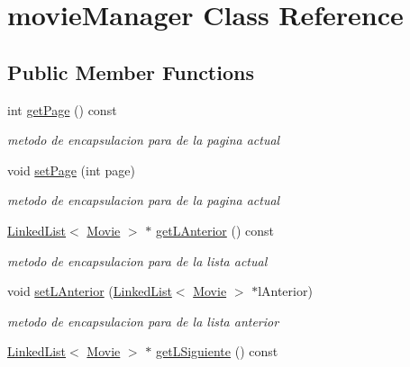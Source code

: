 \hypertarget{classmovieManager}{}\section{movie\+Manager Class Reference}
\label{classmovieManager}
\subsection*{Public Member Functions}
\begin{DoxyCompactItemize}
\item 
\mbox{\label{classmovieManager_adc89da5248a92df9f9d8ae06000752c4}} 
int \hyperlink{classmovieManager_adc89da5248a92df9f9d8ae06000752c4}{get\+Page} () const
\begin{DoxyCompactList}\small\item\em metodo de encapsulacion para de la pagina actual \end{DoxyCompactList}\item 
void \hyperlink{classmovieManager_aa82aab8426bf729738f8b14321aca9f7}{set\+Page} (int page)
\begin{DoxyCompactList}\small\item\em metodo de encapsulacion para de la pagina actual \end{DoxyCompactList}\item 
\hyperlink{classLinkedList}{Linked\+List}$<$ \hyperlink{classMovie}{Movie} $>$ $\ast$ \hyperlink{classmovieManager_a3e5c3fa6d602f2f28459c9c7edf723a3}{get\+L\+Anterior} () const
\begin{DoxyCompactList}\small\item\em metodo de encapsulacion para de la lista actual \end{DoxyCompactList}\item 
void \hyperlink{classmovieManager_a1f35573336c4c9ae656917ed5deddc2d}{set\+L\+Anterior} (\hyperlink{classLinkedList}{Linked\+List}$<$ \hyperlink{classMovie}{Movie} $>$ $\ast$l\+Anterior)
\begin{DoxyCompactList}\small\item\em metodo de encapsulacion para de la lista anterior \end{DoxyCompactList}\item 
\mbox{\label{classmovieManager_a5aa49b2a77cf32f217e0e1810270eccc}} 
\hyperlink{classLinkedList}{Linked\+List}$<$ \hyperlink{classMovie}{Movie} $>$ $\ast$ \hyperlink{classmovieManager_a5aa49b2a77cf32f217e0e1810270eccc}{get\+L\+Siguiente} () const

\end{DoxyCompactItemize}
